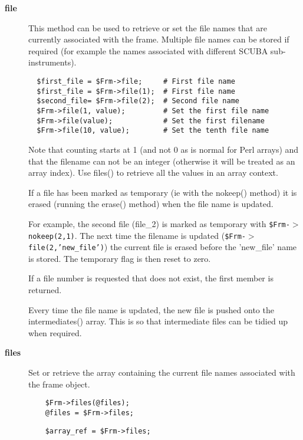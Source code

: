 \begin{description}
\item[\textbf{file}] \mbox{}

This method can be used to retrieve or set the file names that are 
currently associated with the frame. Multiple file names can be stored
if required (for example the names associated with different 
SCUBA sub-instruments).

\begin{verbatim}
  $first_file = $Frm->file;     # First file name
  $first_file = $Frm->file(1);  # First file name
  $second_file= $Frm->file(2);  # Second file name
  $Frm->file(1, value);         # Set the first file name
  $Frm->file(value);            # Set the first filename
  $Frm->file(10, value);        # Set the tenth file name
\end{verbatim}


Note that counting starts at 1 (and not 0 as is normal for Perl 
arrays) and that the filename can not be an integer (otherwise
it will be treated as an array index). Use files() to retrieve
all the values in an array context.



If a file has been marked as temporary (ie with the nokeep()
method) it is erased (running the erase() method) when the file
name is updated.



For example, the second file (file\_2) is marked as temporary
with \texttt{\$Frm-$>$nokeep(2,1)}. The next time the filename is updated
(\texttt{\$Frm-$>$file(2,'new\_file')}) the current file is erased before the
'new\_file' name is stored. The temporary flag is then reset to
zero.



If a file number is requested that does not exist, the first
member is returned.



Every time the file name is updated, the new file is pushed onto
the intermediates() array. This is so that intermediate files
can be tidied up when required.

\item[\textbf{files}] \mbox{}

Set or retrieve the array containing the current file names
associated with the frame object.

\begin{verbatim}
    $Frm->files(@files);
    @files = $Frm->files;
\end{verbatim}
\begin{verbatim}
    $array_ref = $Frm->files;
\end{verbatim}



\end{description}
